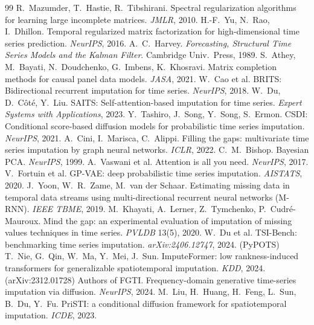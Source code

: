 \documentclass[10pt,twocolumn]{article}
\begin{document}
\twocolumn

\begin{thebibliography}{99}\small\setlength{\itemsep}{0pt}
 R.~Mazumder, T.~Hastie, R.~Tibshirani. Spectral
regularization algorithms for learning large incomplete matrices. \emph{JMLR},
2010.
 H.-F.~Yu, N.~Rao, I.~Dhillon. Temporal regularized matrix
factorization for high-dimensional time series prediction. \emph{NeurIPS}, 2016.
 A.~C.~Harvey. \emph{Forecasting, Structural Time Series
Models and the Kalman Filter}. Cambridge Univ.\ Press, 1989.
 S.~Athey, M.~Bayati, N.~Doudchenko, G.~Imbens, K.~Khosravi.
Matrix completion methods for causal panel data models. \emph{JASA}, 2021.
 W.~Cao et al. BRITS: Bidirectional recurrent imputation for
time series. \emph{NeurIPS}, 2018.
 W.~Du, D.~C\^ot\'e, Y.~Liu. SAITS: Self-attention-based
imputation for time series. \emph{Expert Systems with Applications}, 2023.
 Y.~Tashiro, J.~Song, Y.~Song, S.~Ermon. CSDI: Conditional
score-based diffusion models for probabilistic time series imputation.
\emph{NeurIPS}, 2021.
 A.~Cini, I.~Marisca, C.~Alippi. Filling the gaps: multivariate
time series imputation by graph neural networks. \emph{ICLR}, 2022.
 C.~M.~Bishop. Bayesian PCA. \emph{NeurIPS}, 1999.
 A.~Vaswani et al. Attention is all you need.
\emph{NeurIPS}, 2017.
 V.~Fortuin et al. GP-VAE: deep probabilistic time series
imputation. \emph{AISTATS}, 2020.
 J.~Yoon, W.~R.~Zame, M.~van der Schaar. Estimating missing
data in temporal data streams using multi-directional recurrent neural networks
(M-RNN). \emph{IEEE TBME}, 2019.
 M.~Khayati, A.~Lerner, Z.~Tymchenko, P.~Cudr\'e-Mauroux.
Mind the gap: an experimental evaluation of imputation of missing values
techniques in time series. \emph{PVLDB} 13(5), 2020.
 W.~Du et al. TSI-Bench: benchmarking time series
imputation. \emph{arXiv:2406.12747}, 2024. (PyPOTS)
 T.~Nie, G.~Qin, W.~Ma, Y.~Mei, J.~Sun.
ImputeFormer: low rankness-induced transformers for generalizable spatiotemporal
imputation. \emph{KDD}, 2024. (arXiv:2312.01728)
 Authors of FGTI. Frequency-domain generative time-series
imputation via diffusion. \emph{NeurIPS}, 2024.
 M.~Liu, H.~Huang, H.~Feng, L.~Sun, B.~Du, Y.~Fu. PriSTI: a
conditional diffusion framework for spatiotemporal imputation. \emph{ICDE}, 2023.

\end{thebibliography}
\end{document}
